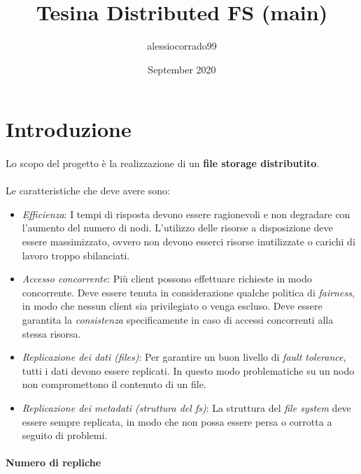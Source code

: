 \documentclass{article}
\title{Tesina Distributed FS (main)}
\author{alessiocorrado99 }
\date{September 2020}
\begin{document}
\maketitle

\section{Introduzione} 

\paragraph{} Lo scopo del progetto è la realizzazione di un \textbf{file storage distributito}. 

\paragraph{} Le caratteristiche che deve avere sono:

\begin{itemize}
	\item \emph{Efficienza}: I tempi di risposta devono essere ragionevoli e non degradare con l'aumento del numero di nodi. L'utilizzo delle risorse a disposizione deve essere massimizzato, ovvero non devono esserci risorse inutilizzate o carichi di lavoro troppo sbilanciati.  
	
	\item \emph{Accesso concorrente}: Più client possono effettuare richieste in modo concorrente. Deve essere tenuta in considerazione qualche politica di \emph{fairness}, 
	in modo che nessun client sia privilegiato o venga escluso. Deve essere garantita la 
	\emph{consistenza} specificamente in caso di accessi concorrenti alla stessa risorsa. 
	 
	\item \emph{Replicazione dei dati (files)}: Per garantire un buon livello di \emph{fault tolerance}, tutti i dati devono essere replicati. In questo modo problematiche su un nodo non compromettono il contenuto di un file. 
	
	\item \emph{Replicazione dei metadati (struttura del fs)}: La struttura del \emph{file system} deve essere sempre replicata, in modo che non possa essere persa o corrotta a seguito di problemi. 
\end{itemize} 



\paragraph{Numero di repliche}
\end{document}
